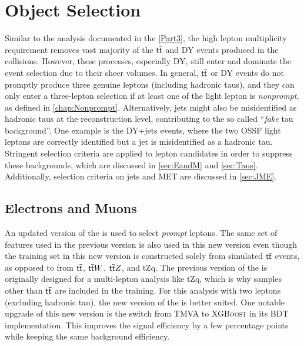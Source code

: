\chapter{Object Selection}
\label{chap:Obj}

Similar to the analysis documented in the \autoref{Part3}, the high lepton multiplicity requirement removes vast majority of the $\textsf{t}\overline{\textsf{t}}$ and \ac{DY} events produced in the collisions. However, these processes, especially \ac{DY}, still enter and dominate the event selection due to their sheer volumes. In general, $\textsf{t}\overline{\textsf{t}}$ or \ac{DY} events do not promptly produce three genuine leptons (including hadronic taus), and they can only enter a three-lepton selection if at least one of the light lepton is \emph{nonprompt}, as defined in \autoref{chap:Nonprompt}. Alternatively, jets might also be misidentified as hadronic taus at the reconstruction level, contributing to the so called ``\emph{fake} tau background''. One example is the \ac{DY}+jets events, where the two \ac{OSSF} light leptons are correctly identified but a jet is misidentified as a hadronic tau. Stringent selection criteria are applied to lepton candidates in order to suppress these backgrounds, which are discussed in \autoref{sec:EandM} and \autoref{sec:Taus}. Additionally, selection criteria on jets and \ac{MET} are discussed in \autoref{sec:JME}.

\section{Electrons and Muons}
\label{sec:EandM}

An updated version of the \TOP\cite{CMS:2023ftu} is used to select \emph{prompt} leptons. The same set of features used in the previous version is also used in this new version even though the training set in this new version is constructed solely from simulated $\textsf{t}\overline{\textsf{t}}$ events, as opposed to from $\textsf{t}\overline{\textsf{t}}$, $\textsf{t}\overline{\textsf{t}} W$, $\textsf{t}\overline{\textsf{t}} Z$, and tZq. The previous version of the \TOP is originally designed for a multi-lepton analysis like tZq, which is why samples other than $\textsf{t}\overline{\textsf{t}}$ are included in the training. For this analysis with two leptons (excluding hadronic tau), the new version of the \TOP is better suited. One notable upgrade of this new version is the switch from TMVA \cite{TMVA:2007ngy} to \textsc{XGBoost} \cite{Chen:2016:XST:2939672.2939785} in its \ac{BDT} implementation. This improves the signal efficiency by a few percentage points while keeping the same background efficiency. 

